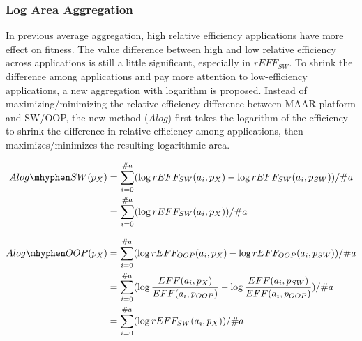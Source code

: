 \subsubsection{Log Area Aggregation}

In previous average aggregation, high relative efficiency applications have more effect on fitness. The value difference between high and low relative efficiency across applications is still a little significant, especially in $rEFF_{SW}$. To shrink the difference among applications and pay more attention to low-efficiency applications, a new aggregation with logarithm is proposed.
Instead of maximizing/minimizing the relative efficiency difference between MAAR platform and SW/OOP, the new method ($Alog$) first takes the logarithm of the efficiency to shrink the difference in relative efficiency among applications, then maximizes/minimizes the resulting logarithmic area.

\begingroup\makeatletter{}\check@mathfonts
\vspace{-8pt}
\begin{equation}
\begin{split}
	Alog\mhyphen SW(p_{X})
	&= \sum_{i=0}^{\#a} ( \log rEFF_{SW}(a_{i}, p_{X}) - \log rEFF_{SW}(a_{i}, p_{SW}) ) / \#a \\
	&= \sum_{i=0}^{\#a} ( \log rEFF_{SW}(a_{i}, p_{X}) ) / \#a 
\label{eq:logSW}
\end{split}
\end{equation}
\endgroup

\begingroup\makeatletter{}\check@mathfonts
\vspace{-8pt}
\begin{equation}
\begin{split}
	Alog\mhyphen OOP(p_{X})
	&= \sum_{i=0}^{\#a} ( \log rEFF_{OOP}(a_{i}, p_{X}) - \log rEFF_{OOP}(a_{i}, p_{SW}) ) / \#a \\
	&= \sum_{i=0}^{\#a} ( \log \frac{EFF(a_{i}, p_{X})}{EFF(a_{i}, p_{OOP})} - \log \frac{EFF(a_{i}, p_{SW})}{EFF(a_{i}, p_{OOP})} ) / \#a \\
	&= \sum_{i=0}^{\#a} ( \log rEFF_{SW}(a_{i}, p_{X}) ) / \#a
\label{eq:logOOP}
\end{split}
\end{equation}
\endgroup


